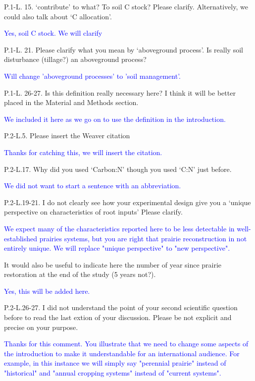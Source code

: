 \documentclass[]{article}
\begin{document}
P.1-L. 15. `contribute' to what? To soil C stock? Please clarify.
Alternatively, we could also talk about `C allocation'.

\textcolor{blue}{Yes, soil C stock. We will clarify}

P.1-L. 21. Please clarify what you mean by `aboveground process'. Is
really soil disturbance (tillage?) an aboveground process?

\textcolor{blue}{Will change 'aboveground processes' to 'soil management'.}

P.1-L. 26-27. Is this definition really necessary here? I think it will
be better placed in the Material and Methods section.

\textcolor{blue}{We included it here as we go on to use the definition in the introduction.}

P.2-L.5. Please insert the Weaver citation

\textcolor{blue}{Thanks for catching this, we will insert the citation.}

P.2-L.17. Why did you used `Carbon:N' though you used `C:N' just before.

\textcolor{blue}{We did not want to start a sentence with an abbreviation.}

P.2-L.19-21. I do not clearly see how your experimental design give you
a `unique perspective on characteristics of root inputs' Please clarify.

\textcolor{blue}{We expect many of the characteristics reported here to be less detectable in well-established prairies systems, but you are right that prairie reconstruction in not entirely unique. We will replace "unique perspective" to "new perspective".}

It would also be useful to indicate here the number of year since
prairie restoration at the end of the study (5 years not?).

\textcolor{blue}{Yes, this will be added here.}

P.2-L.26-27. I did not understand the point of your second scientific
question before to read the last extion of your discussion. Please be
not explicit and precise on your purpose.

\textcolor{blue}{Thanks for this comment. You illustrate that we need to change some aspects of the introduction to make it understandable for an international audience. For example, in this instance we will simply say "perennial prairie" instead of "historical" and "annual cropping systems" instead of "current systems".}
\end{document}
